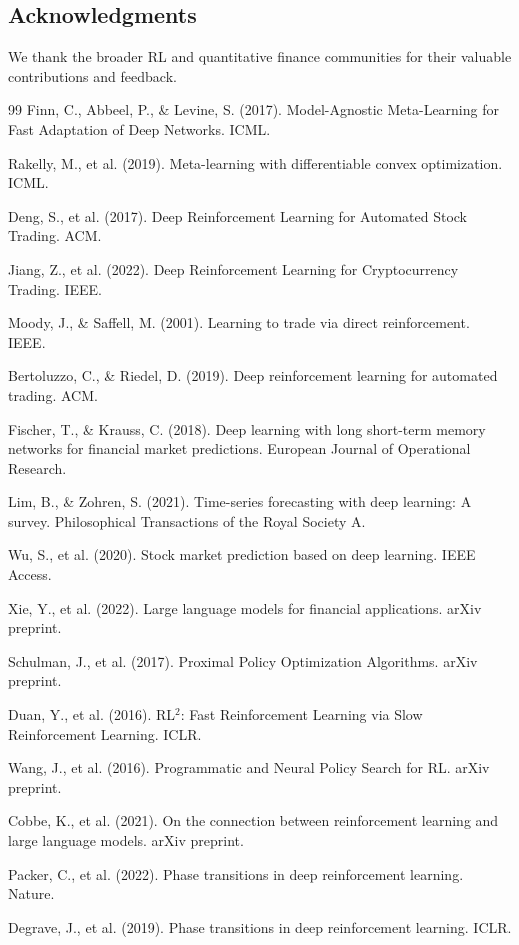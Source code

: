 \documentclass[10pt,journal]{IEEEtran}
\begin{document}
\subsection*{Acknowledgments}
We thank the broader RL and quantitative finance communities for their valuable contributions and feedback.

\begin{thebibliography}{99}
 Finn, C., Abbeel, P., \& Levine, S. (2017). Model-Agnostic Meta-Learning for Fast Adaptation of Deep Networks. ICML.

 Rakelly, M., et al. (2019). Meta-learning with differentiable convex optimization. ICML.

 Deng, S., et al. (2017). Deep Reinforcement Learning for Automated Stock Trading. ACM.

 Jiang, Z., et al. (2022). Deep Reinforcement Learning for Cryptocurrency Trading. IEEE.

 Moody, J., \& Saffell, M. (2001). Learning to trade via direct reinforcement. IEEE.

 Bertoluzzo, C., \& Riedel, D. (2019). Deep reinforcement learning for automated trading. ACM.

 Fischer, T., \& Krauss, C. (2018). Deep learning with long short-term memory networks for financial market predictions. European Journal of Operational Research.

 Lim, B., \& Zohren, S. (2021). Time-series forecasting with deep learning: A survey. Philosophical Transactions of the Royal Society A.

 Wu, S., et al. (2020). Stock market prediction based on deep learning. IEEE Access.

 Xie, Y., et al. (2022). Large language models for financial applications. arXiv preprint.

 Schulman, J., et al. (2017). Proximal Policy Optimization Algorithms. arXiv preprint.

 Duan, Y., et al. (2016). RL$^2$: Fast Reinforcement Learning via Slow Reinforcement Learning. ICLR.

 Wang, J., et al. (2016). Programmatic and Neural Policy Search for RL. arXiv preprint.

 Cobbe, K., et al. (2021). On the connection between reinforcement learning and large language models. arXiv preprint.

 Packer, C., et al. (2022). Phase transitions in deep reinforcement learning. Nature.

 Degrave, J., et al. (2019). Phase transitions in deep reinforcement learning. ICLR.
\end{thebibliography}
\end{document}
